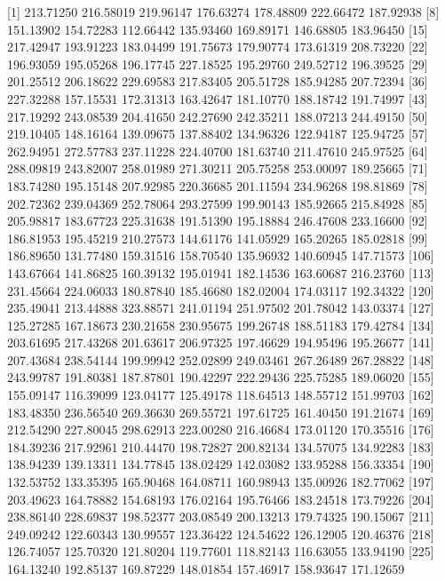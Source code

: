 \documentclass[
  10pt,
  a4paper,oneside]{article}
\begin{document}
{[}1{]} 213.71250 216.58019 219.96147 176.63274 178.48809 222.66472 187.92938
{[}8{]} 151.13902 154.72283 112.66442 135.93460 169.89171 146.68805 183.96450
{[}15{]} 217.42947 193.91223 183.04499 191.75673 179.90774 173.61319 208.73220
{[}22{]} 196.93059 195.05268 196.17745 227.18525 195.29760 249.52712 196.39525
{[}29{]} 201.25512 206.18622 229.69583 217.83405 205.51728 185.94285 207.72394
{[}36{]} 227.32288 157.15531 172.31313 163.42647 181.10770 188.18742 191.74997
{[}43{]} 217.19292 243.08539 204.41650 242.27690 242.35211 188.07213 244.49150
{[}50{]} 219.10405 148.16164 139.09675 137.88402 134.96326 122.94187 125.94725
{[}57{]} 262.94951 272.57783 237.11228 224.40700 181.63740 211.47610 245.97525
{[}64{]} 288.09819 243.82007 258.01989 271.30211 205.75258 253.00097 189.25665
{[}71{]} 183.74280 195.15148 207.92985 220.36685 201.11594 234.96268 198.81869
{[}78{]} 202.72362 239.04369 252.78064 293.27599 199.90143 185.92665 215.84928
{[}85{]} 205.98817 183.67723 225.31638 191.51390 195.18884 246.47608 233.16600
{[}92{]} 186.81953 195.45219 210.27573 144.61176 141.05929 165.20265 185.02818
{[}99{]} 186.89650 131.77480 159.31516 158.70540 135.96932 140.60945 147.71573
{[}106{]} 143.67664 141.86825 160.39132 195.01941 182.14536 163.60687 216.23760
{[}113{]} 231.45664 224.06033 180.87840 185.46680 182.02004 174.03117 192.34322
{[}120{]} 235.49041 213.44888 323.88571 241.01194 251.97502 201.78042 143.03374
{[}127{]} 125.27285 167.18673 230.21658 230.95675 199.26748 188.51183 179.42784
{[}134{]} 203.61695 217.43268 201.63617 206.97325 197.46629 194.95496 195.26677
{[}141{]} 207.43684 238.54144 199.99942 252.02899 249.03461 267.26489 267.28822
{[}148{]} 243.99787 191.80381 187.87801 190.42297 222.29436 225.75285 189.06020
{[}155{]} 155.09147 116.39099 123.04177 125.49178 118.64513 148.55712 151.99703
{[}162{]} 183.48350 236.56540 269.36630 269.55721 197.61725 161.40450 191.21674
{[}169{]} 212.54290 227.80045 298.62913 223.00280 216.46684 173.01120 170.35516
{[}176{]} 184.39236 217.92961 210.44470 198.72827 200.82134 134.57075 134.92283
{[}183{]} 138.94239 139.13311 134.77845 138.02429 142.03082 133.95288 156.33354
{[}190{]} 132.53752 133.35395 165.90468 164.08711 160.98943 135.00926 182.77062
{[}197{]} 203.49623 164.78882 154.68193 176.02164 195.76466 183.24518 173.79226
{[}204{]} 238.86140 228.69837 198.52377 203.08549 200.13213 179.74325 190.15067
{[}211{]} 249.09242 122.60343 130.99557 123.36422 124.54622 126.12905 120.46376
{[}218{]} 126.74057 125.70320 121.80204 119.77601 118.82143 116.63055 133.94190
{[}225{]} 164.13240 192.85137 169.87229 148.01854 157.46917 158.93647 171.12659
\end{document}
